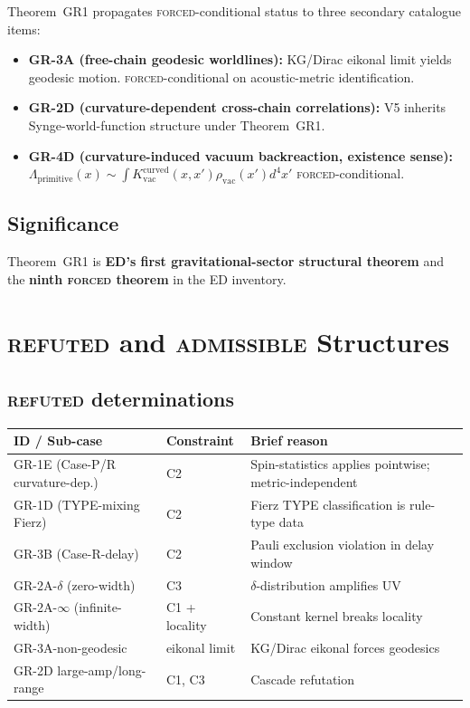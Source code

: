 \documentclass[11pt,a4paper]{article}
\begin{document}
Theorem~GR1 propagates \textsc{forced}-conditional status to three secondary catalogue items:
\begin{itemize}
  \item \textbf{GR-3A (free-chain geodesic worldlines):} KG/Dirac eikonal limit yields geodesic motion. \textsc{forced}-conditional on acoustic-metric identification.
  \item \textbf{GR-2D (curvature-dependent cross-chain correlations):} V5 inherits Synge-world-function structure under Theorem~GR1.
  \item \textbf{GR-4D (curvature-induced vacuum backreaction, existence sense):} $\Lambda_\mathrm{primitive}(x) \sim \int K_\mathrm{vac}^\mathrm{curved}(x, x') \rho_\mathrm{vac}(x') d^4 x'$ \textsc{forced}-conditional.
\end{itemize}

\subsection{Significance}

Theorem~GR1 is \textbf{ED's first gravitational-sector structural theorem} and the \textbf{ninth \textsc{forced} theorem} in the ED inventory.

\section{\textsc{refuted} and \textsc{admissible} Structures}

\subsection{\textsc{refuted} determinations}

\begin{center}
\begin{tabular}{lll}
\hline
ID / Sub-case & Constraint & Brief reason \\
\hline
GR-1E (Case-P/R curvature-dep.) & C2 & Spin-statistics applies pointwise; metric-independent \\
GR-1D (TYPE-mixing Fierz) & C2 & Fierz TYPE classification is rule-type data \\
GR-3B (Case-R-delay) & C2 & Pauli exclusion violation in delay window \\
GR-2A-$\delta$ (zero-width) & C3 & $\delta$-distribution amplifies UV \\
GR-2A-$\infty$ (infinite-width) & C1 + locality & Constant kernel breaks locality \\
GR-3A-non-geodesic & eikonal limit & KG/Dirac eikonal forces geodesics \\
GR-2D large-amp/long-range & C1, C3 & Cascade refutation \\
\hline
\end{tabular}
\end{center}
\end{document}
